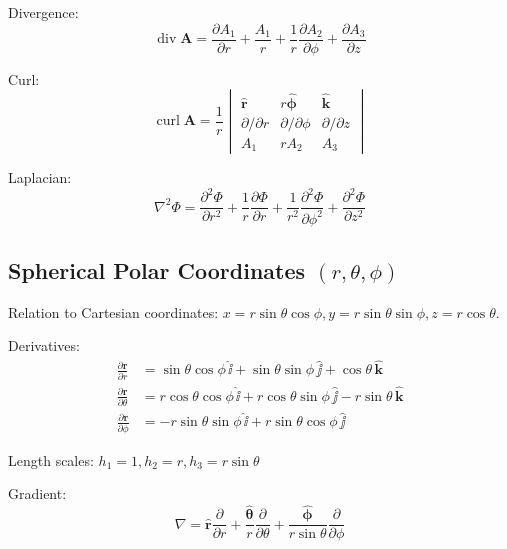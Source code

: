 \documentclass{article}
\theoremstyle{definition}
\theoremstyle{definition}
\theoremstyle{remark}
\newcommand{\vecr}{\mathbf{r}}
\newcommand{\vecA}{\mathbf{A}}
\newcommand{\bhat}[1]{\mathbf{\hat{#1}}}
\newcommand{\ihat}{\bhat{\ii}}
\newcommand{\jhat}{\bhat{\jj}}
\newcommand{\khat}{\bhat{k}}
\DeclareMathOperator{\vdiv}{div}
\DeclareMathOperator{\vcurl}{curl}
\begin{document}
\noindent Divergence:
\begin{equation*}
    \vdiv \vecA = \frac{\partial A_1}{\partial r} + \frac{A_1}{r} + \frac{1}{r} \frac{\partial A_2}{\partial \phi} + \frac{\partial A_3}{\partial z}
\end{equation*}

\noindent Curl:
\begin{equation*}
    \vcurl \vecA = \frac{1}{r}
    \begin{vmatrix}
        \bhat{r} & r \bhat{\phi} & \khat \\
        \partial / \partial r & \partial / \partial \phi & \partial / \partial z \\
        A_1 & r A_2 & A_3
    \end{vmatrix}
\end{equation*}

\noindent Laplacian:
\begin{equation*}
    \nabla^2 \Phi = \frac{\partial^2 \Phi}{\partial r^2} + \frac{1}{r} \frac{\partial \Phi}{\partial r} + \frac{1}{r^2} \frac{\partial^2 \Phi}{\partial \phi^2} + \frac{\partial^2 \Phi}{\partial z^2}
\end{equation*}

\subsection{Spherical Polar Coordinates $(r, \theta, \phi)$}

Relation to Cartesian coordinates: $x = r \sin \theta \cos \phi, y = r \sin \theta \sin \phi, z = r \cos \theta$.

\noindent Derivatives:
\begin{align*}
    \frac{\partial \vecr}{\partial r} &= \sin \theta \cos \phi \,\ihat + \sin \theta \sin \phi \,\jhat + \cos \theta \,\khat \\
    \frac{\partial \vecr}{\partial \theta} &= r \cos \theta \cos \phi \,\ihat + r \cos \theta \sin \phi \,\jhat - r \sin \theta \,\khat \\
    \frac{\partial \vecr}{\partial \phi} &= -r \sin \theta \sin \phi \,\ihat + r \sin \theta \cos \phi \,\jhat
\end{align*}

\noindent Length scales: $h_1 = 1, h_2 = r, h_3 = r \sin \theta$

\noindent Gradient:
\begin{equation*}
    \nabla = \bhat{r} \frac{\partial}{\partial r} + \frac{\bhat{\theta}}{r} \frac{\partial}{\partial \theta} + \frac{\bhat{\phi}}{r \sin \theta} \frac{\partial}{\partial \phi}
\end{equation*}
\end{document}
